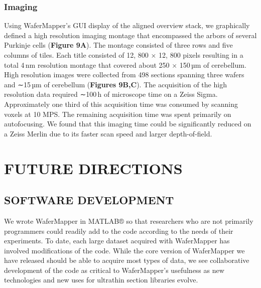 \documentclass{article}
\begin{document}
\subsubsection*{Imaging}

Using WaferMapper’s GUI display of the aligned overview stack, we graphically defined a high resolution imaging montage that encompassed the arbors of several Purkinje cells (\textbf{Figure 9A}). The montage consisted of three rows and five columns of tiles. Each title consisted of 12, 800 × 12, 800 pixels resulting in a total 4\,nm resolution montage that covered about 250 × 150\,µm of cerebellum. High resolution images were collected from 498 sections spanning three wafers and ∼15\,µm of cerebellum (\textbf{Figures 9B,C}). The acquisition of the high resolution data required ∼100\,h of microscope time on a Zeiss Sigma. Approximately one third of this acquisition time was consumed by scanning voxels at 10 MPS. The remaining acquisition time was spent primarily on autofocusing. We found that this imaging time could be significantly reduced on a Zeiss Merlin due to its faster scan speed and larger depth-of-field.

\section*{FUTURE DIRECTIONS}
\subsection*{SOFTWARE DEVELOPMENT}

We wrote WaferMapper in MATLAB® so that researchers who are not primarily programmers could readily add to the code according to the needs of their experiments. To date, each large dataset acquired with WaferMapper has involved modifications of the code. While the core version of WaferMapper we have released should be able to acquire most types of data, we see collaborative development of the code as critical to WaferMapper’s usefulness as new technologies and new uses for ultrathin section libraries evolve.
\end{document}
